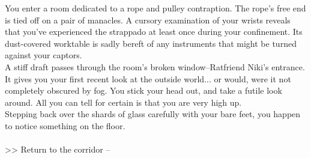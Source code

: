 You enter a room dedicated to a rope and pulley contraption. The rope’s free end is tied off on a pair of manacles. A cursory examination of your wrists reveals that you’ve experienced the strappado at least once during your confinement. Its dust-covered worktable is sadly bereft of any instruments that might be turned against your captors.\\

A stiff draft passes through the room’s broken window--Ratfriend Niki’s entrance. It gives you your first recent look at the outside world... or would, were it not completely obscured by fog. You stick your head out, and take a futile look around. All you can tell for certain is that you are very high up.\\

Stepping back over the shards of glass carefully with your bare feet, you happen to notice something on the floor.\\
\\

>> Return to the corridor -- 